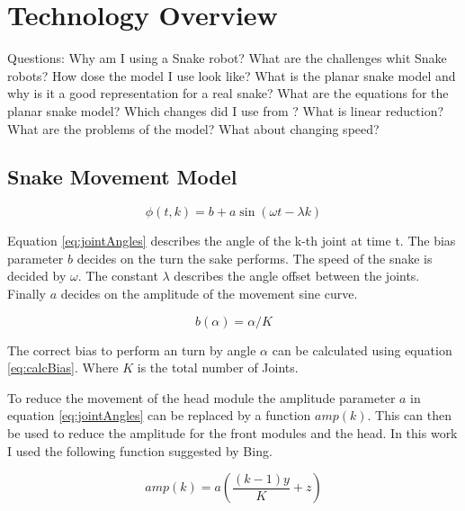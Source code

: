 \chapter{Technology Overview}
\label{section:theory}





Questions:
Why am I using a Snake robot?
What are the challenges whit Snake robots?
How dose the model I use look like?
What is the planar snake model and why is it a good representation for a real snake?
What are the equations for the planar snake model?
Which changes did I use from \cite{Bing}?
What is linear reduction?
What are the problems of the model?
What about changing speed?





\section{Snake Movement Model}




\begin{equation} \label{eq:jointAngles}
\phi\left(t, k\right) = b + a \sin \left(\omega t - \lambda k\right)
\end{equation}

Equation \ref{eq:jointAngles} describes the angle of the k-th joint at time t. The bias parameter $ b $ decides on the turn the sake performs. The speed of the snake is decided by $ \omega$. The constant $\lambda $ describes the angle offset between the joints. Finally $ a $ decides on the amplitude of the movement sine curve.

\begin{equation} \label{eq:calcBias}
b\left(\alpha\right) = \alpha / K
\end{equation}

The correct bias to perform an turn by angle $ \alpha $ can be calculated using equation \ref{eq:calcBias}. Where $ K $ is the total number of Joints.

To reduce the movement of the head module the amplitude parameter $ a $ in equation \ref{eq:jointAngles} can be replaced by a function $amp\left(k\right)$. This can then be used to reduce the amplitude for the front modules and the head. In this work I used the following function suggested by Bing\cite{Bing}.

\begin{equation}\label{eq:amp}
amp\left(k\right) = a \left(\frac{\left(k - 1\right) y}{K} + z\right)
\end{equation}

